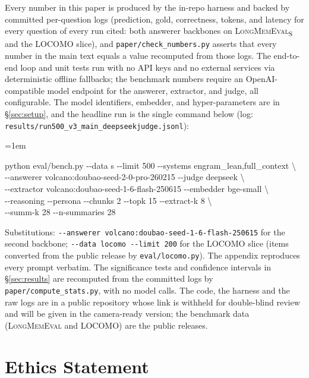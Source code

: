\documentclass{article}
\newif\ifanon \ificlrfinal\anonfalse\else\anontrue\fi
\begin{document}
Every number in this paper is produced by the in-repo harness and backed by committed per-question logs
(prediction, gold, correctness, tokens, and latency for every question of every run cited: both answerer
backbones on \textsc{LongMemEval}\textsubscript{S} and the LOCOMO slice), and \texttt{paper/check\_numbers.py}
asserts that every number in the main text equals a value recomputed from those logs. The end-to-end loop and unit
tests run with no API keys and no external services via deterministic offline fallbacks; the benchmark
numbers require an OpenAI-compatible model endpoint for the answerer, extractor, and judge, all configurable.
The model identifiers, embedder, and hyper-parameters are in \S\ref{sec:setup}, and the headline run is
the single command below (log: \texttt{results/run500\_v3\_main\_deepseekjudge.jsonl}):
\begin{list}{}{\leftmargin=1em}\item[]\footnotesize\ttfamily
python eval/bench.py -{}-data s -{}-limit 500 -{}-systems engram\_lean,full\_context \textbackslash\\
\hspace*{1.5em}-{}-answerer volcano:doubao-seed-2-0-pro-260215 -{}-judge deepseek \textbackslash\\
\hspace*{1.5em}-{}-extractor volcano:doubao-seed-1-6-flash-250615 -{}-embedder bge-small \textbackslash\\
\hspace*{1.5em}-{}-reasoning -{}-persona -{}-chunks 2 -{}-topk 15 -{}-extract-k 8 \textbackslash\\
\hspace*{1.5em}-{}-summ-k 28 -{}-n-summaries 28
\end{list}
Substitutions: \texttt{-{}-answerer volcano:doubao-seed-1-6-flash-250615} for the second backbone;
\texttt{-{}-data locomo -{}-limit 200} for the LOCOMO slice (items converted from the public release by
\texttt{eval/locomo.py}). The appendix reproduces every prompt verbatim. The significance tests and
confidence intervals in \S\ref{sec:results} are recomputed from the committed logs by
\texttt{paper/compute\_stats.py}, with no model calls. The code, the harness and the raw logs are
\ifanon in a public repository whose link is withheld for double-blind review and will be given in the
camera-ready version\else at \url{https://github.com/ly-wang19/engram}\fi; the benchmark data
(\textsc{LongMemEval} and LOCOMO) are the public releases.

\section*{Ethics Statement}
\label{sec:ethics}
\end{document}
